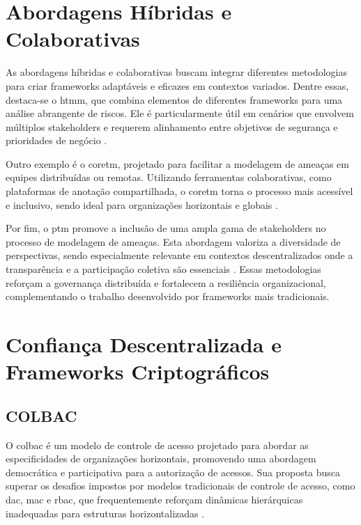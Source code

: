 \section{Abordagens Híbridas e Colaborativas}
\label{sec:hybrid_collaborative_approaches}

As abordagens híbridas e colaborativas buscam integrar diferentes
metodologias para criar frameworks adaptáveis e eficazes em contextos
variados. Dentre essas, destaca-se o \gls{htmm}, que combina elementos
de diferentes frameworks para uma análise abrangente de riscos.
Ele é particularmente útil em cenários que envolvem múltiplos
stakeholders e requerem alinhamento entre objetivos de segurança
e prioridades de negócio \cite{AHybridThreatModelingMethod}.

Outro exemplo é o \gls{coretm},
projetado para facilitar a modelagem de ameaças em equipes
distribuídas ou remotas. Utilizando ferramentas colaborativas, como
plataformas de anotação compartilhada, o \gls{coretm} torna o processo mais
acessível e inclusivo, sendo ideal para organizações horizontais e
globais \cite{CoReTM}.

Por fim, o \gls{ptm} promove a inclusão de
uma ampla gama de stakeholders no processo de modelagem de ameaças.
Esta abordagem valoriza a diversidade de perspectivas, sendo
especialmente relevante em contextos descentralizados onde a
transparência e a participação coletiva são essenciais
\cite{ParticipatoryThreatModelling}. Essas metodologias reforçam a
governança distribuída e fortalecem a resiliência organizacional,
complementando o trabalho desenvolvido por frameworks mais
tradicionais.



\section{Confiança Descentralizada e Frameworks Criptográficos}
\label{sec:decentralized_cryptographic}

\subsection{COLBAC}
\label{subsec:colbac}

O \gls{colbac} é um modelo de controle de
acesso projetado para abordar as especificidades de organizações
horizontais, promovendo uma abordagem democrática e participativa para
a autorização de acessos. Sua proposta busca superar os desafios
impostos por modelos tradicionais de controle de acesso, como
\gls{dac}, \gls{mac} e \gls{rbac}, que frequentemente reforçam dinâmicas
hierárquicas inadequadas para estruturas horizontalizadas \cite{Colbac}.

